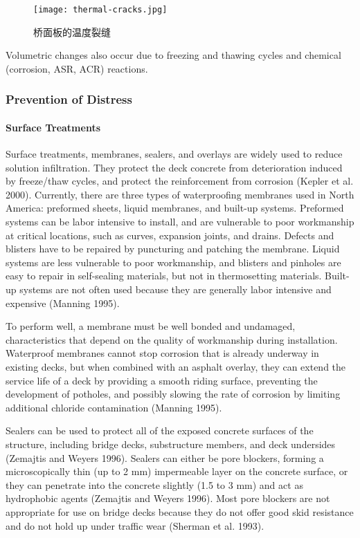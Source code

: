 \begin{figure}
  \texttt{[image: thermal-cracks.jpg]}
  \caption{桥面板的温度裂缝}
  \label{fig:thermal-cracks}
\end{figure}

Volumetric changes also occur due to freezing and thawing cycles and chemical (corrosion, ASR, ACR) reactions.

\subsubsection{Prevention of Distress}

\paragraph{Surface Treatments}
Surface treatments, membranes, sealers, and overlays are widely used to reduce solution infiltration. They
protect the deck concrete from deterioration induced by freeze/thaw cycles, and protect the reinforcement from
corrosion (Kepler et al. 2000). Currently, there are three types of waterproofing membranes used in North America:
preformed sheets, liquid membranes, and built-up systems. Preformed systems can be labor intensive to install, and
are vulnerable to poor workmanship at critical locations, such as curves, expansion joints, and drains. Defects and
blisters have to be repaired by puncturing and patching the membrane. Liquid systems are less vulnerable to poor
workmanship, and blisters and pinholes are easy to repair in self-sealing materials, but not in thermosetting materials.
Built-up systems are not often used because they are generally labor intensive and expensive (Manning 1995).

To perform well, a membrane must be well bonded and undamaged, characteristics that depend on the quality of
workmanship during installation. Waterproof membranes cannot stop corrosion that is already underway in existing
decks, but when combined with an asphalt overlay, they can extend the service life of a deck by providing a smooth
riding surface, preventing the development of potholes, and possibly slowing the rate of corrosion by limiting
additional chloride contamination (Manning 1995).

Sealers can be used to protect all of the exposed concrete surfaces of the structure, including bridge decks,
substructure members, and deck undersides (Zemajtis and Weyers 1996). Sealers can either be pore blockers,
forming a microscopically thin (up to 2 mm) impermeable layer on the concrete surface, or they can penetrate into
the concrete slightly (1.5 to 3 mm) and act as hydrophobic agents (Zemajtis and Weyers 1996). Most pore blockers
are not appropriate for use on bridge decks because they do not offer good skid resistance and do not hold up under
traffic wear (Sherman et al. 1993).

